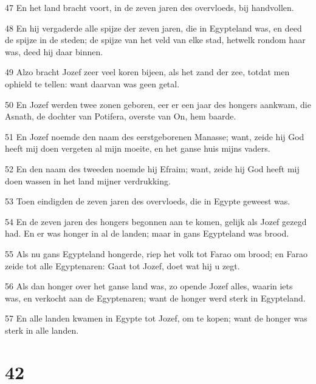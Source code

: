 \par 47 En het land bracht voort, in de zeven jaren des overvloeds, bij handvollen.
\par 48 En hij vergaderde alle spijze der zeven jaren, die in Egypteland was, en deed de spijze in de steden; de spijze van het veld van elke stad, hetwelk rondom haar was, deed hij daar binnen.
\par 49 Alzo bracht Jozef zeer veel koren bijeen, als het zand der zee, totdat men ophield te tellen: want daarvan was geen getal.
\par 50 En Jozef werden twee zonen geboren, eer er een jaar des hongers aankwam, die Asnath, de dochter van Potifera, overste van On, hem baarde.
\par 51 En Jozef noemde den naam des eerstgeborenen Manasse; want, zeide hij God heeft mij doen vergeten al mijn moeite, en het ganse huis mijns vaders.
\par 52 En den naam des tweeden noemde hij Efraim; want, zeide hij God heeft mij doen wassen in het land mijner verdrukking.
\par 53 Toen eindigden de zeven jaren des overvloeds, die in Egypte geweest was.
\par 54 En de zeven jaren des hongers begonnen aan te komen, gelijk als Jozef gezegd had. En er was honger in al de landen; maar in gans Egypteland was brood.
\par 55 Als nu gans Egypteland hongerde, riep het volk tot Farao om brood; en Farao zeide tot alle Egyptenaren: Gaat tot Jozef, doet wat hij u zegt.
\par 56 Als dan honger over het ganse land was, zo opende Jozef alles, waarin iets was, en verkocht aan de Egyptenaren; want de honger werd sterk in Egypteland.
\par 57 En alle landen kwamen in Egypte tot Jozef, om te kopen; want de honger was sterk in alle landen.

\chapter{42}

